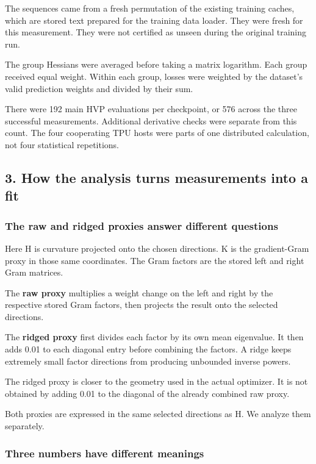 \documentclass[
  14pt,
  letterpaper,
]{extarticle}
\begin{document}
The sequences came from a fresh permutation of the existing training
caches, which are stored text prepared for the training data loader.
They were fresh for this measurement. They were not certified as unseen
during the original training run.

The group Hessians were averaged before taking a matrix logarithm. Each
group received equal weight. Within each group, losses were weighted by
the dataset's valid prediction weights and divided by their sum.

There were 192 main HVP evaluations per checkpoint, or 576 across the
three successful measurements. Additional derivative checks were
separate from this count. The four cooperating TPU hosts were parts of
one distributed calculation, not four statistical repetitions.

\subsection{3. How the analysis turns measurements into a
fit}\label{how-the-analysis-turns-measurements-into-a-fit}

\subsubsection{The raw and ridged proxies answer different
questions}\label{the-raw-and-ridged-proxies-answer-different-questions}

Here H is curvature projected onto the chosen directions. K is the
gradient-Gram proxy in those same coordinates. The Gram factors are the
stored left and right Gram matrices.

The \textbf{raw proxy} multiplies a weight change on the left and right
by the respective stored Gram factors, then projects the result onto the
selected directions.

The \textbf{ridged proxy} first divides each factor by its own mean
eigenvalue. It then adds 0.01 to each diagonal entry before combining
the factors. A ridge keeps extremely small factor directions from
producing unbounded inverse powers.

The ridged proxy is closer to the geometry used in the actual optimizer.
It is not obtained by adding 0.01 to the diagonal of the already
combined raw proxy.

Both proxies are expressed in the same selected directions as H. We
analyze them separately.

\subsubsection{Three numbers have different
meanings}\label{three-numbers-have-different-meanings}
\end{document}
